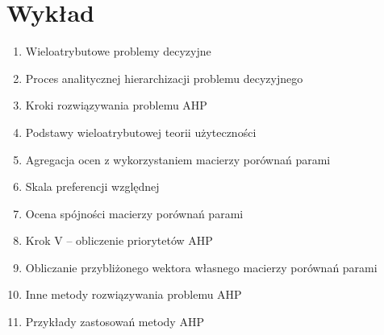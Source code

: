 ﻿\documentclass[11pt]{article}
\begin{document}
    \section{Wykład}
    \begin{enumerate}
        \item Wieloatrybutowe problemy decyzyjne
        \item Proces analitycznej hierarchizacji problemu decyzyjnego
        \item Kroki rozwiązywania problemu AHP
        \item Podstawy wieloatrybutowej teorii użyteczności
        \item Agregacja ocen z wykorzystaniem macierzy porównań parami
        \item Skala preferencji względnej
        \item Ocena spójności macierzy porównań parami
        \item Krok V – obliczenie priorytetów AHP
        \item Obliczanie przybliżonego wektora własnego macierzy porównań parami
        \item Inne metody rozwiązywania problemu AHP
        \item Przykłady zastosowań metody AHP
    \end{enumerate}
\end{document}
